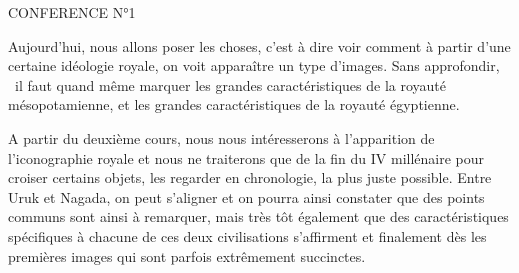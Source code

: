 \documentclass[a4paper]{article}
\newcommand{\DirImg}{../img/FaivreMartin/}
\begin{document}
%
%
%
%
%
%
%
%
%
%
%


CONFERENCE N°1 \ 


Aujourd'hui, nous allons poser les choses, c'est à dire voir comment à partir d'une certaine idéologie royale, on voit
apparaître un type d'images. Sans approfondir, \ il faut quand même marquer les grandes caractéristiques de la royauté
mésopotamienne, et les grandes caractéristiques de la royauté égyptienne.


A partir du deuxième cours, nous nous intéresserons à l'apparition de l'iconographie royale et nous ne traiterons que de
la fin du IV millénaire pour croiser certains objets, les regarder en chronologie, la plus juste possible. Entre Uruk
et Nagada, on peut s'aligner et on pourra ainsi constater que des points communs sont ainsi à remarquer, mais très tôt
également que des caractéristiques spécifiques à chacune de ces deux civilisations s'affirment et finalement dès les
premières images qui sont parfois extrêmement succinctes.
\end{document}
